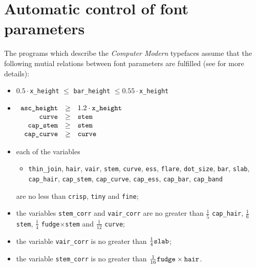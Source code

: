\section{Automatic control of font parameters\label{CORR}}

The \MF{} programs which describe the {\sl Computer Modern} typefaces
assume that the following mutial relations between font parameters
are fulfilled (see \cite{CM} for more details):
\begin{itemize}
\item $0.5\cdot${\tt x\_height} $\le$ {\tt bar\_height}
      $\le 0.55\cdot${\tt x\_height}
\item $\displaystyle\begin{array}[t]{rcl}
      \hbox{\tt asc\_height} &\ge& 1.2\cdot\hbox{\tt x\_height}\\
      \hbox{\tt curve} &\ge& \hbox{\tt stem}\\
      \hbox{\tt cap\_stem} &\ge& \hbox{\tt stem}\\
      \hbox{\tt cap\_curve} &\ge& \hbox{\tt curve}
      \end{array}$
\item
each of the variables
\begin{itemize}
\item[] \begin{flushleft}
        {\tt thin\_join}, {\tt hair}, {\tt vair}, {\tt stem}, {\tt curve},
        {\tt ess}, {\tt flare}, {\tt dot\_size}, {\tt bar}, {\tt slab},
        {\tt cap\_hair}, {\tt cap\_stem}, {\tt cap\_curve},
        {\tt cap\_ess}, {\tt cap\_bar}, {\tt cap\_band}
        \end{flushleft}
\end{itemize}
are no less than {\tt crisp}, {\tt tiny} and {\tt fine};
\item
the variables {\tt stem\_corr} and {\tt vair\_corr}
are no greater than
$\frac{1}{5}$ {\tt cap\_hair},
$\frac{1}{6}$ {\tt stem},
$\frac{1}{4}$ {\tt fudge}$\times${\tt stem}
and $\frac{1}{12}$ {\tt curve};
\item
the variable {\tt vair\_corr} is no greater than
$\frac{1}{4}\hbox{\tt slab}$;
\item
the variable {\tt stem\_corr} is no greater than
$\frac{1}{16}\hbox{\tt fudge}\times\hbox{\tt hair}$.
\end{itemize}

